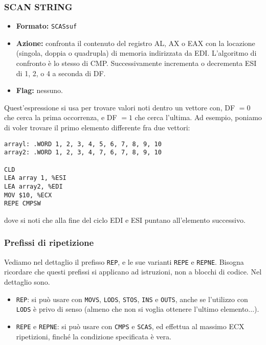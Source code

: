\documentclass[a4paper,11pt]{article}
\begin{document}
\subsubsection{SCAN STRING}
\begin{itemize}
	\item \textbf{Formato:} \lstinline|SCASsuf| 
	\item \textbf{Azione:} confronta il contenuto del registro AL, AX o EAX con la locazione (singola, doppia o quadrupla) di memoria indirizzata da EDI. L'algoritmo di confronto è lo stesso di CMP. 
		Successivamente incrementa o decrementa ESI di 1, 2, o 4 a seconda di DF. 

	\item \textbf{Flag:} nessuno.
\end{itemize}

Quest'espressione si usa per trovare valori noti dentro un vettore con, DF $=0$ che cerca la prima occorrenza, e DF $=1$ che cerca l'ultima. Ad esempio, poniamo di voler trovare il primo elemento differente fra due vettori:
\begin{lstlisting}	
arrayl: .WORD 1, 2, 3, 4, 5, 6, 7, 8, 9, 10
array2: .WORD 1, 2, 3, 4, 7, 6, 7, 8, 9, 10

CLD
LEA array 1, %ESI
LEA array2, %EDI
MOV $10, %ECX
REPE CMPSW
\end{lstlisting}

dove si noti che alla fine del ciclo EDI e ESI puntano all'elemento successivo. 

\subsubsection{Prefissi di ripetizione}
Vediamo nel dettaglio il prefisso \lstinline|REP|, e le sue varianti \lstinline|REPE| e \lstinline|REPNE|.
Bisogna ricordare che questi prefissi si applicano ad istruzioni, non a blocchi di codice.
Nel dettaglio sono.
\begin{itemize}
	\item \lstinline|REP|: si può usare con \lstinline|MOVS|, \lstinline|LODS|, \lstinline|STOS|, \lstinline|INS| e \lstinline|OUTS|, anche se l'utilizzo con \lstinline|LODS| è privo di senso (almeno che non si voglia ottenere l'ultimo elemento...).
	\item \lstinline|REPE| e \lstinline|REPNE|: si può usare con \lstinline|CMPS| e \lstinline|SCAS|, ed effettua al massimo ECX ripetizioni, finché la condizione specificata è vera.
\end{itemize}
\end{document}
